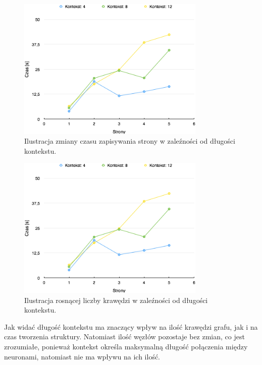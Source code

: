 \begin{figure}[!h]
    \centering
    \label{graph:wplyw_kontekstu}
    \includegraphics[width=0.8\textwidth]{wplyw_kontekstu}
    \caption{Ilustracja zmiany czasu zapisywania strony w zaleźności od długości kontekstu.}
\end{figure}

\begin{figure}[!h]
    \centering
    \label{graph:wplyw_kontekstu}
    \includegraphics[width=0.8\textwidth]{wplyw_kontekstu}
    \caption{Ilustracja rosnącej liczby krawędzi w zaleźności od długości kontekstu.}
\end{figure}

Jak widać długość kontekstu ma znaczący wpływ na ilość krawędzi grafu, jak i na czas tworzenia struktury. Natomiast ilość węzłów pozostaje bez zmian, co jest zrozumiałe,
ponieważ kontekst określa maksymalną długość połączenia między neuronami, natomiast nie ma wpływu na ich ilość. 

